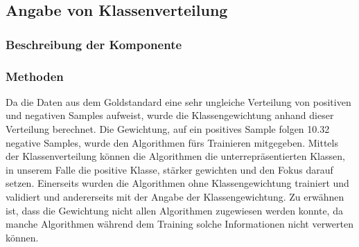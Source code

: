 \subsection{Angabe von Klassenverteilung}
\subsubsection{Beschreibung der Komponente}
\subsubsection{Methoden}
Da die Daten aus dem Goldstandard eine sehr ungleiche Verteilung von positiven und negativen Samples aufweist, wurde die Klassengewichtung anhand dieser Verteilung berechnet.
Die Gewichtung, auf ein positives Sample folgen 10.32 negative Samples, wurde den Algorithmen fürs Trainieren mitgegeben.
Mittels der Klassenverteilung können die Algorithmen die unterrepräsentierten Klassen, in unserem Falle die positive Klasse, stärker gewichten und den Fokus darauf setzen.
Einerseits wurden die Algorithmen ohne Klassengewichtung trainiert und validiert und andererseits mit der Angabe der Klassengewichtung.
Zu erwähnen ist, dass die Gewichtung nicht allen Algorithmen zugewiesen werden konnte, da manche Algorithmen während dem Training solche Informationen nicht verwerten können.
